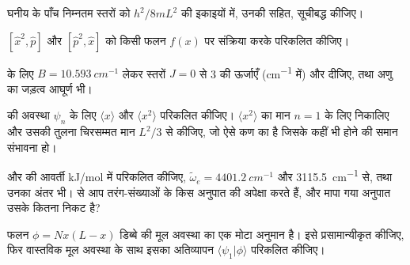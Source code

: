 \begin{exercise}[$\star$]\label{exo:b3:quantum-model-systems:2}
घनीय  के पाँच निम्नतम स्तरों को
$h^2/8mL^2$ की इकाइयों में, उनकी  सहित, सूचीबद्ध कीजिए।
\end{exercise}

\begin{exercise}[$\star$]\label{exo:b3:quantum-model-systems:3}
 $[\hat x^2,\hat p]$ और $[\hat p^2,\hat x]$ को किसी फलन $f(x)$ पर
संक्रिया करके परिकलित कीजिए।
\end{exercise}

\begin{exercise}[$\star$]\label{exo:b3:quantum-model-systems:4}
 के लिए $B = \qty{10.593}{cm^{-1}}$ लेकर स्तरों $J = 0$ से 3 की ऊर्जाएँ
(\unit{cm^{-1}} में) और  दीजिए, तथा अणु का जड़त्व
आघूर्ण भी।
\end{exercise}

\begin{exercise}[$\star\star$]\label{exo:b3:quantum-model-systems:5}
 की अवस्था $\psi_n$ के लिए $\langle x\rangle$ और
$\langle x^2\rangle$ परिकलित कीजिए। $\langle x^2\rangle$ का मान $n = 1$ के लिए निकालिए और
उसकी तुलना चिरसम्मत मान $L^2/3$ से कीजिए, जो ऐसे कण का है जिसके कहीं भी होने की समान संभावना हो।
\end{exercise}

\begin{exercise}[$\star\star$]\label{exo:b3:quantum-model-systems:6}
 और  की आवर्ती 
\unit{kJ/mol} में परिकलित कीजिए, $\tilde\omega_e = \qty{4401.2}{cm^{-1}}$ और
\qty{3115.5}{cm^{-1}} से, तथा उनका अंतर भी।  से आप तरंग-संख्याओं के
किस अनुपात की अपेक्षा करते हैं, और मापा गया अनुपात उसके कितना निकट है?
\end{exercise}

\begin{exercise}[$\star\star$]\label{exo:b3:quantum-model-systems:7}
फलन $\phi = Nx(L - x)$ डिब्बे की मूल अवस्था का एक मोटा अनुमान है।
इसे प्रसामान्यीकृत कीजिए, फिर वास्तविक मूल अवस्था के साथ इसका अतिव्यापन
$\langle\psi_1|\phi\rangle$ परिकलित कीजिए।
\end{exercise}

